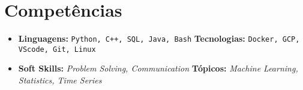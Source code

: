 \documentclass[letterpaper,11pt]{article}
\newcommand{\resumeSubHeadingListStart}{\begin{itemize}[leftmargin=*]}
\newcommand{\resumeSubHeadingListEnd}{\end{itemize}}
\begin{document}
\section{Competências}
 \resumeSubHeadingListStart
    \item{
     \textbf{Linguagens: }{\color{gray}\texttt{Python, C++, SQL, Java, Bash}}
     \hfill
     \textbf{Tecnologias: }{\color{gray}\texttt{Docker, GCP, VScode, Git, Linux}}
    }
    \item{
    \textbf{Soft Skills: }{\color{gray}\textit{Problem Solving, Communication}}
    \hfill
    \textbf{Tópicos: }{\color{gray}\textit{Machine Learning, Statistics, Time Series}}
    }
 \resumeSubHeadingListEnd
\end{document}
